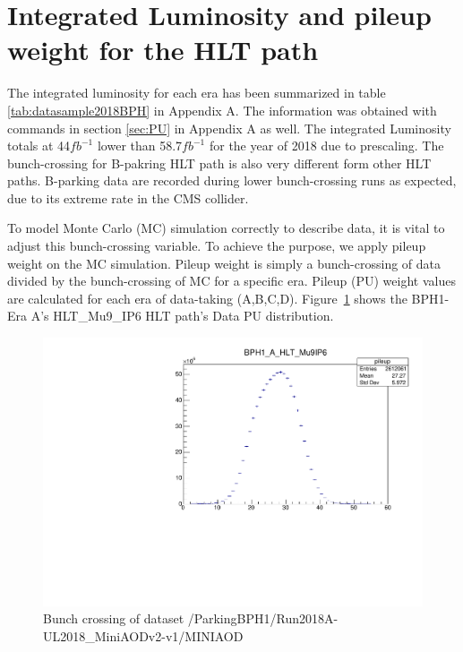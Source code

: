 \section{Integrated Luminosity and pileup weight for the HLT path}

The integrated luminosity for each era has been summarized in table \ref{tab:datasample2018BPH} in Appendix A. 
The information was obtained with commands in section \ref{sec:PU} in Appendix A as well.
The integrated Luminosity totals at 44$fb^{-1}$ lower than 58.7$fb^{-1}$ for the year of 2018 due to prescaling.
The bunch-crossing for B-pakring HLT path is also very different form other HLT paths.
B-parking data are recorded during lower bunch-crossing runs as expected, due to its extreme rate in the CMS collider.

To model Monte Carlo (MC) simulation correctly to describe data, it is vital to adjust this bunch-crossing variable. 
To achieve the purpose, we apply pileup weight on the MC simulation.
Pileup weight is simply a bunch-crossing of data divided by the bunch-crossing of MC for a specific era.
Pileup (PU) weight values are calculated for each era of data-taking (A,B,C,D).
Figure~\ref{fig:EraAData} shows the BPH1-Era A's HLT\_Mu9\_IP6 HLT path's Data PU distribution.
\begin{figure}[h!]
  \caption{Bunch crossing of dataset /ParkingBPH1/Run2018A-UL2018\_MiniAODv2-v1/MINIAOD}
  \label{fig:EraAData}
  \centering
  \includegraphics[width=0.67\linewidth]{figs/BPH1AData.pdf}

\end{figure}

